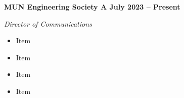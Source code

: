 \vspace{0.1cm}
\textbf{MUN Engineering Society A \hfill July 2023 -- Present} \par
\textit{Director of Communications} \par
\begin{itemize}
	\item Item
  \item Item
  \item Item
  \item Item
\end{itemize} \par